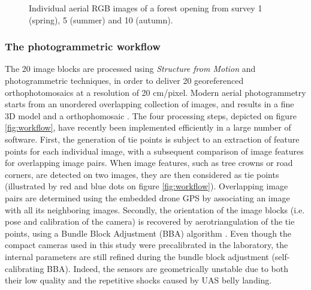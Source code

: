\documentclass[remotesensing,article,submit,moreauthors,pdftex,12pt,a4paper]{mdpi} %
\begin{document}
\begin{figure}
\captionsetup[subfigure]{labelformat=empty}
\centering
{}\hspace{0.01mm}
\hspace{0.01mm}
\hspace{0.01mm}
\caption{Individual aerial RGB images of a forest opening from survey 1 (spring), 5 (summer) and 10 (autumn).}
\label{fig:TS_RawIm}
\end{figure}

\subsubsection{The photogrammetric workflow}

The 20 image blocks are processed using \textit{Structure from Motion} and photogrammetric techniques, in order to deliver 20 georeferenced orthophotomosaics at a resolution of 20 cm/pixel. 
Modern aerial photogrammetry starts from an unordered overlapping collection of images, and results in a fine 3D model and a orthophomosaic \citep{dandois_high_2013}. 
The four processing steps, depicted on figure \ref{fig:workflow}, have recently been implemented efficiently in a large number of software. 
First, the generation of tie points is subject to an extraction of feature points for each individual image, with a subsequent comparison of image features for overlapping image pairs. 
When image features, such as tree crowns or road corners, are detected on two images, they are then considered as tie points (illustrated by red and blue dots on figure \ref{fig:workflow}). 
Overlapping image pairs are determined using the embedded drone GPS by associating an image with all its neighboring images. 
Secondly, the orientation of the image blocks (i.e. pose and calibration of the camera) is recovered by aerotriangulation of the tie points, using a Bundle Block Adjustment (BBA) algorithm \cite{triggs_bundle_2000}. 
Even though the compact cameras used in this study were precalibrated in the laboratory, the internal parameters are still refined during the bundle block adjustment (self-calibrating BBA). Indeed, the sensors are geometrically unstable due to both their low quality \cite{labe_geometric_2004} and the repetitive shocks caused by UAS belly landing.
\end{document}
